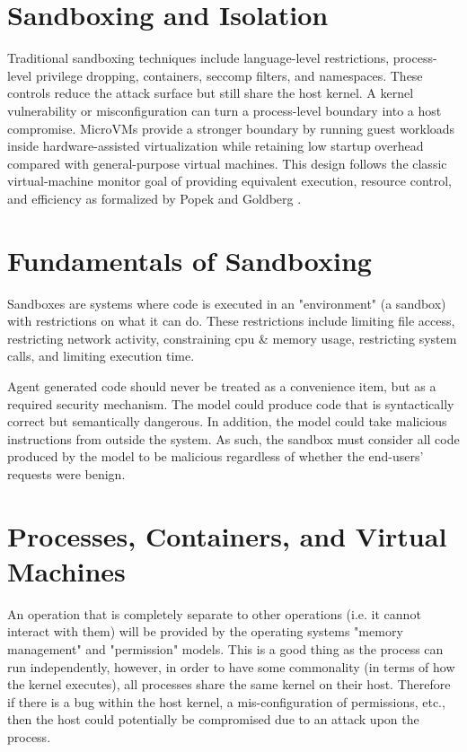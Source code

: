 \section{Sandboxing and Isolation}
Traditional sandboxing techniques include language-level restrictions,
process-level privilege dropping, containers, seccomp filters, and namespaces.
These controls reduce the attack surface but still share the host kernel. A
kernel vulnerability or misconfiguration can turn a process-level boundary into a
host compromise. MicroVMs provide a stronger boundary by running guest workloads
inside hardware-assisted virtualization while retaining low startup overhead
compared with general-purpose virtual machines. This design follows the classic
virtual-machine monitor goal of providing equivalent execution, resource
control, and efficiency as formalized by Popek and Goldberg
\cite{popek1974formal}.

\section{Fundamentals of Sandboxing}
Sandboxes are systems where code is executed in an "environment" (a sandbox) with restrictions on what it can do. These restrictions include limiting file access, restricting network activity, constraining cpu & memory usage, restricting system calls, and limiting execution time.

Agent generated code should never be treated as a convenience item, but as a required security mechanism. The model could produce code that is syntactically correct but semantically dangerous. In addition, the model could take malicious instructions from outside the system. As such, the sandbox must consider all code produced by the model to be malicious regardless of whether the end-users' requests were benign.

\section{Processes, Containers, and Virtual Machines}
An operation that is completely separate to other operations (i.e. it cannot interact with them) will be provided by the operating systems "memory management" and "permission" models. This is a good thing as the process can run independently, however, in order to have some commonality (in terms of how the kernel executes), all processes share the same kernel on their host. Therefore if there is a bug within the host kernel, a mis-configuration of permissions, etc., then the host could potentially be compromised due to an attack upon the process.

